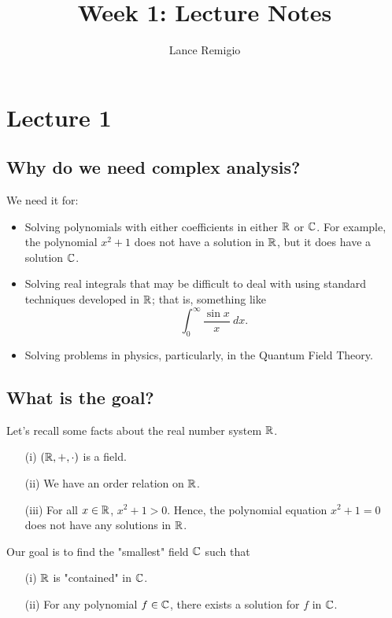 \documentclass[a4paper]{report}
\title{Week 1: Lecture Notes}
\author{Lance Remigio}
\begin{document}
\maketitle   

\section{Lecture 1}

\subsection{Why do we need complex analysis?}

We need it for:
\begin{itemize}
    \item Solving polynomials with either coefficients in either \( \mathbb{R}  \) or \( \mathbb{C} \). For example, the polynomial \( x^{2} + 1  \) does not have a solution in \( \mathbb{R}  \), but it does have a solution \( \mathbb{C}  \).
    \item Solving real integrals that may be difficult to deal with using standard techniques developed in \( \mathbb{R}  \); that is, something like
    \[ \int_{ 0 }^{ \infty  }  \frac{ \sin x  }{x}   \ dx.   \]
    \item Solving problems in physics, particularly, in the Quantum Field Theory.
\end{itemize}

\subsection{What is the goal?}

Let's recall some facts about the real number system \( \mathbb{R}  \).
\begin{enumerate}
    \item[(i)] \( (\mathbb{R} , + , \cdot) \) is a field.
    \item[(ii)] We have an order relation on \( \mathbb{R}  \).
    \item[(iii)] For all \( x \in \mathbb{R}  \), \( x^{2} + 1 > 0  \). Hence, the polynomial equation \( x^{2} + 1 = 0  \) does not have any solutions in \( \mathbb{R}  \).
\end{enumerate}

Our goal is to find the "smallest" field \( \mathbb{C}  \) such that 
\begin{enumerate}
    \item[(i)] \( \mathbb{R}  \) is "contained" in \( \mathbb{C}  \).
    \item[(ii)] For any polynomial \(  f \in \mathbb{C}  \), there exists a solution for \( f \) in \( \mathbb{C}  \). 
\end{enumerate}
\end{document}
